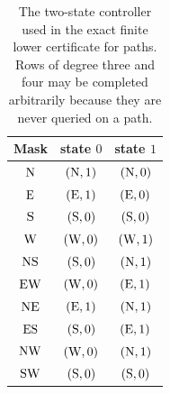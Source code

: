 \begin{table}[!htbp]
\centering\small
\begin{tabular}{@{}c|cc@{}}
\toprule
Mask & state $0$ & state $1$\\
\midrule
$\mathrm{N}$ & $(\mathrm{N},1)$ & $(\mathrm{N},0)$\\
$\mathrm{E}$ & $(\mathrm{E},1)$ & $(\mathrm{E},0)$\\
$\mathrm{S}$ & $(\mathrm{S},0)$ & $(\mathrm{S},0)$\\
$\mathrm{W}$ & $(\mathrm{W},0)$ & $(\mathrm{W},1)$\\
$\mathrm{N}\mathrm{S}$ & $(\mathrm{S},0)$ & $(\mathrm{N},1)$\\
$\mathrm{E}\mathrm{W}$ & $(\mathrm{W},0)$ & $(\mathrm{E},1)$\\
$\mathrm{N}\mathrm{E}$ & $(\mathrm{E},1)$ & $(\mathrm{N},1)$\\
$\mathrm{E}\mathrm{S}$ & $(\mathrm{S},0)$ & $(\mathrm{E},1)$\\
$\mathrm{N}\mathrm{W}$ & $(\mathrm{W},0)$ & $(\mathrm{N},1)$\\
$\mathrm{S}\mathrm{W}$ & $(\mathrm{S},0)$ & $(\mathrm{S},0)$\\
\bottomrule
\end{tabular}
\caption{The two-state controller used in the exact finite lower certificate for paths.  Rows of degree three and four may be completed arbitrarily because they are never queried on a path.}
\label{tab:path-survivor}
\end{table}
